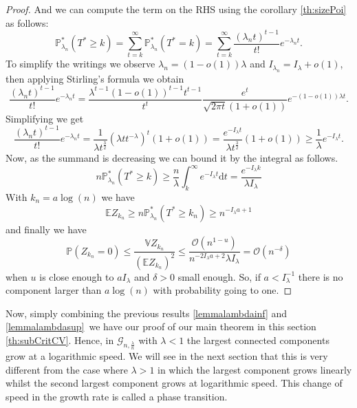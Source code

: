 \begin{proof}
	And we can compute the term on the RHS using the corollary \ref{th:sizePoi} as follows:
	\begin{equation}
		\mathbb{P}_{\lambda_n}^*(T^* \geq k)
		 = \sum_{t=k}^{\infty} \mathbb{P}_{\lambda_n}^*(T^* = k)
		 = \sum_{t=k}^{\infty} \frac{(\lambda_n t)^{t-1}}{t!} e^{-\lambda_n t}.
	\end{equation}
	To simplify the writings we observe $\lambda_n = (1-o(1))\lambda$ and $I_{\lambda_n} = I_{\lambda} + o(1)$, then applying Stirling's formula we obtain
	\begin{equation}
		\frac{(\lambda_n t)^{t-1}}{t!} e^{-\lambda_n t}
		= \frac{\lambda^{t-1} (1-o(1))^{t-1}t^{t-1}}{t^t} \frac{e^t}{\sqrt{2\pi t}(1 + o(1))} e^{-(1-o(1))\lambda t}.	
	\end{equation}
	Simplifying we get
	\begin{equation}
		\frac{(\lambda_n t)^{t-1}}{t!} e^{-\lambda_n t}
		= \frac{1}{\lambda t^{\frac{3}{2}}}(\lambda t t^{-\lambda})^t (1 + o(1))
		= \frac{e^{-I_{\lambda} t }}{\lambda t^{\frac{3}{2}}} (1 + o(1)) \geq \frac{1}{\lambda}e^{-I_{\lambda} t}.
	\end{equation}
	Now, as the summand is decreasing we can bound it by the integral as follows.
	\begin{equation}
		n\mathbb{P}_{\lambda_n}^*(T^* \geq k)
		\geq \frac{n}{\lambda} \int_{k}^{\infty} e^{-I_{\lambda} t} \mathrm{d}t
		 = \frac{e^{-I_{\lambda} k}}{\lambda I_{\lambda}}
	\end{equation}
	With $k_n = a\log(n)$ we have 
	\begin{equation}
		\mathbb{E} Z_{k_n} \geq n\mathbb{P}_{\lambda_n}^*(T^* \geq k_n) \geq n^{-I_{\lambda} a + 1}
	\end{equation}
	and finally we have
	\begin{equation}
		\mathbb{P}(Z_{k_n} = 0) \leq \frac{\mathbb{V}Z_{k_n}}{(\mathbb{E}Z_{k_n})^2} \leq \frac{\mathcal{O}(n^{ 1 - u})}{n^{-2I_{\lambda}a + 2} \lambda I_{\lambda}} 	
		= \mathcal{O}(n^{ -\delta})
	\end{equation}
	when $u$ is close enough to $aI_{\lambda}$ and $\delta >0$ small enough.
	\newline
	So, if $a<I_{\lambda}^{-1}$ there is no component larger than $a\log(n)$ with probability going to one.
\end{proof}
Now, simply combining the previous results \eqref{lemmalambdainf} and \eqref{lemmalambdasup} we have our proof of our main theorem in this section \eqref{th:subCritCV}.
Hence, in $\mathcal{G}_{n, \frac{\lambda}{n}}$ with $\lambda < 1$ the largest connected components grow at a logarithmic speed. We will see in the next section that this is very different from the case where $\lambda > 1$ in which the largest component grows linearly whilst the second largest component grows at logarithmic speed.
This change of speed in the growth rate is called a phase transition.

